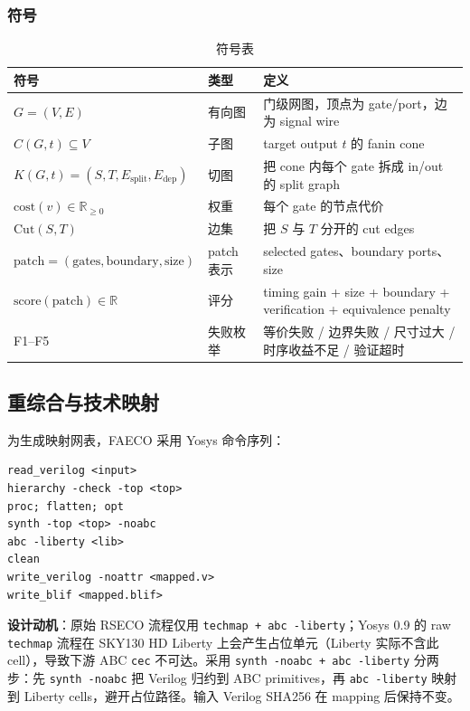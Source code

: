 \documentclass[journal]{IEEEtran}
\begin{document}
\subsubsection{符号}
\begin{table}[!t]
\centering
\caption{符号表}
\label{tab:symbols}
\scriptsize
\setlength{\tabcolsep}{3pt}
\begin{tabular}{lll}
\toprule
\textbf{符号} & \textbf{类型} & \textbf{定义} \\
\midrule
$G = (V, E)$ & 有向图 & 门级网图，顶点为 gate/port，边为 signal wire \\
$C(G, t) \subseteq V$ & 子图 & target output $t$ 的 fanin cone \\
$K(G, t) = (S, T, E_{\mathrm{split}}, E_{\mathrm{dep}})$ & 切图 & 把 cone 内每个 gate 拆成 in/out 的 split graph \\
$\mathrm{cost}(v) \in \mathbb{R}_{\geq 0}$ & 权重 & 每个 gate 的节点代价 \\
$\mathrm{Cut}(S, T)$ & 边集 & 把 $S$ 与 $T$ 分开的 cut edges \\
$\mathrm{patch} = (\mathrm{gates}, \mathrm{boundary}, \mathrm{size})$ & patch 表示 & selected gates、boundary ports、size \\
$\mathrm{score}(\mathrm{patch}) \in \mathbb{R}$ & 评分 & timing gain + size + boundary + verification + equivalence penalty \\
F1--F5 & 失败枚举 & 等价失败 / 边界失败 / 尺寸过大 / 时序收益不足 / 验证超时 \\
\bottomrule
\end{tabular}
\end{table}

\subsection{重综合与技术映射}

为生成映射网表，FAECO 采用 Yosys 命令序列：
\begin{verbatim}
read_verilog <input>
hierarchy -check -top <top>
proc; flatten; opt
synth -top <top> -noabc
abc -liberty <lib>
clean
write_verilog -noattr <mapped.v>
write_blif <mapped.blif>
\end{verbatim}

\textbf{设计动机}：原始 RSECO 流程仅用 \texttt{techmap + abc -liberty}；Yosys 0.9 的 raw \texttt{techmap} 流程在 SKY130 HD Liberty 上会产生占位单元（Liberty 实际不含此 cell），导致下游 ABC \texttt{cec} 不可达。采用 \texttt{synth -noabc + abc -liberty} 分两步：先 \texttt{synth -noabc} 把 Verilog 归约到 ABC primitives，再 \texttt{abc -liberty} 映射到 Liberty cells，避开占位路径。输入 Verilog SHA256 在 mapping 后保持不变。
\end{document}
